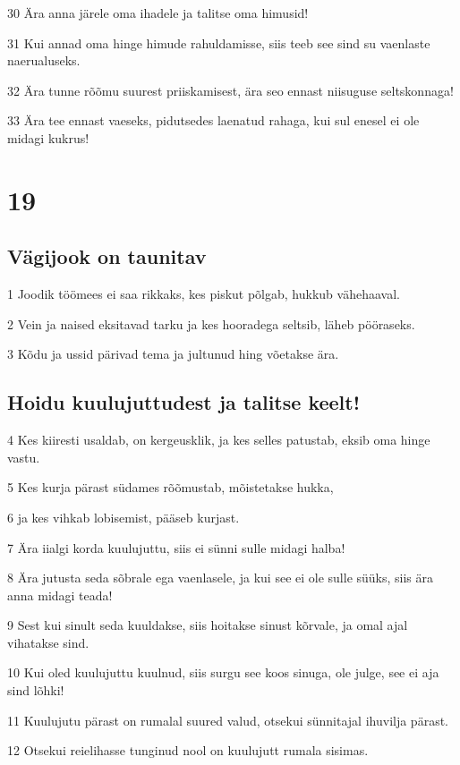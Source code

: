 \par 30 Ära anna järele oma ihadele ja talitse oma himusid!
\par 31 Kui annad oma hinge himude rahuldamisse, siis teeb see sind su vaenlaste naerualuseks.
\par 32 Ära tunne rõõmu suurest priiskamisest, ära seo ennast niisuguse seltskonnaga!
\par 33 Ära tee ennast vaeseks, pidutsedes laenatud rahaga, kui sul enesel ei ole midagi kukrus!

\chapter{19}

\section*{Vägijook on taunitav}

\par 1 Joodik töömees ei saa rikkaks, kes piskut põlgab, hukkub vähehaaval.
\par 2 Vein ja naised eksitavad tarku ja kes hooradega seltsib, läheb pööraseks.
\par 3 Kõdu ja ussid pärivad tema ja jultunud hing võetakse ära.

\section*{Hoidu kuulujuttudest ja talitse keelt!}

\par 4 Kes kiiresti usaldab, on kergeusklik, ja kes selles patustab, eksib oma hinge vastu.
\par 5 Kes kurja pärast südames rõõmustab, mõistetakse hukka,
\par 6 ja kes vihkab lobisemist, pääseb kurjast.
\par 7 Ära iialgi korda kuulujuttu, siis ei sünni sulle midagi halba!
\par 8 Ära jutusta seda sõbrale ega vaenlasele, ja kui see ei ole sulle süüks, siis ära anna midagi teada!
\par 9 Sest kui sinult seda kuuldakse, siis hoitakse sinust kõrvale, ja omal ajal vihatakse sind.
\par 10 Kui oled kuulujuttu kuulnud, siis surgu see koos sinuga, ole julge, see ei aja sind lõhki!
\par 11 Kuulujutu pärast on rumalal suured valud, otsekui sünnitajal ihuvilja pärast.
\par 12 Otsekui reielihasse tunginud nool on kuulujutt rumala sisimas.

